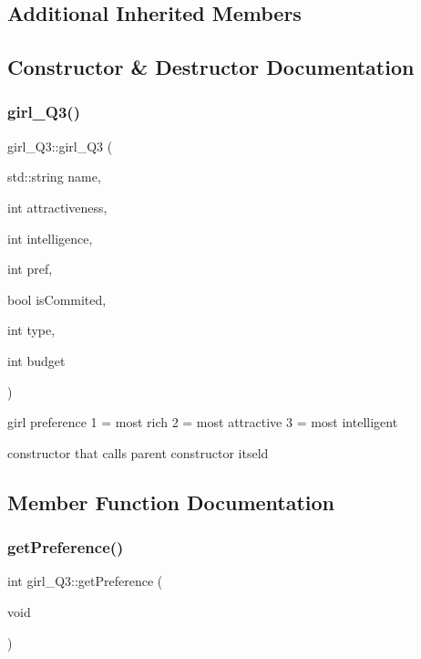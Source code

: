 \subsection*{Additional Inherited Members}


\subsection{Constructor \& Destructor Documentation}
\mbox{\label{classgirl___q3_a2c595ffa07045ad1d7d22ffcc36723a7}} 
\subsubsection{\texorpdfstring{girl\+\_\+\+Q3()}{girl\_Q3()}}
{\footnotesize\ttfamily girl\+\_\+\+Q3\+::girl\+\_\+\+Q3 (\begin{DoxyParamCaption}\item[{std\+::string}]{name,  }\item[{int}]{attractiveness,  }\item[{int}]{intelligence,  }\item[{int}]{pref,  }\item[{bool}]{is\+Commited,  }\item[{int}]{type,  }\item[{int}]{budget }\end{DoxyParamCaption})}



girl preference \textquotesingle{}1\textquotesingle{} = most rich \textquotesingle{}2\textquotesingle{} = most attractive \textquotesingle{}3\textquotesingle{} = most intelligent 

constructor that calls parent constructor itseld 

\subsection{Member Function Documentation}
\mbox{\label{classgirl___q3_a95dbbddc79b5155a877e12e6352e08af}} 
\subsubsection{\texorpdfstring{get\+Preference()}{getPreference()}\hspace{0.1cm}{\footnotesize\ttfamily [1/2]}}
{\footnotesize\ttfamily int girl\+\_\+\+Q3\+::get\+Preference (\begin{DoxyParamCaption}\item[{void}]{ }\end{DoxyParamCaption})}

